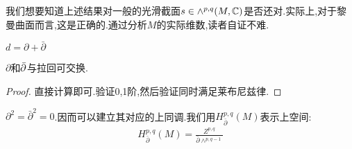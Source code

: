 我们想要知道上述结果对一般的光滑截面$s \in \wedge^{p,q}(M,\mathbb{C})$是否还对.实际上,对于黎曼曲面而言,这是正确的.通过分析$M$的实际维数,读者自证不难.
\begin{proposition}
	$d=\partial+\bar{\partial}$
\end{proposition}
\begin{proposition}
	$\partial$和$\bar{\partial}$与拉回可交换.
\end{proposition}
\begin{proof}
	直接计算即可.验证0,1阶,然后验证同时满足莱布尼兹律.
\end{proof}
\begin{proposition}
	$\partial^2=\bar{\partial}^2=0$.因而可以建立其对应的上同调.我们用$H^{p,q}_{\bar{\partial}}(M)$表示上空间:
	\begin{align*}
		H^{p,q}_{\bar{\partial}}(M)=\frac{Z^{p,q}}{\bar{\partial}\wedge^{p,q-1}}
	\end{align*}
\end{proposition}

